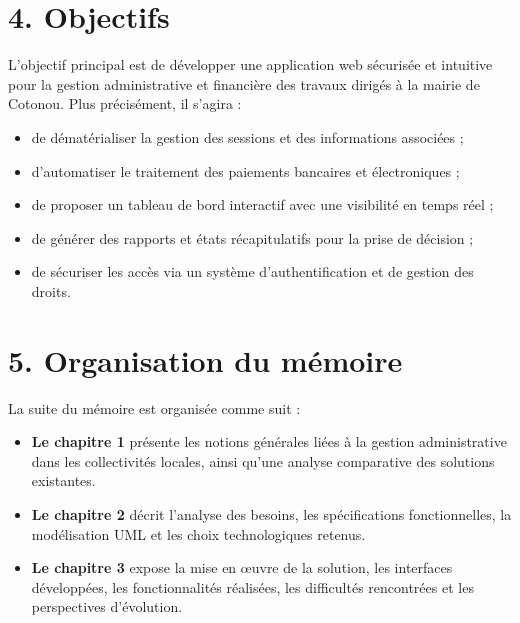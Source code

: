 \section*{4. Objectifs}
L'objectif principal est de développer une application web sécurisée et intuitive pour la gestion administrative et financière des travaux dirigés à la mairie de Cotonou. Plus précisément, il s'agira :
\begin{itemize}[label=\textbullet, leftmargin=1.5cm]
    \item de dématérialiser la gestion des sessions et des informations associées ;
    \item d'automatiser le traitement des paiements bancaires et électroniques ;
    \item de proposer un tableau de bord interactif avec une visibilité en temps réel ;
    \item de générer des rapports et états récapitulatifs pour la prise de décision ;
    \item de sécuriser les accès via un système d'authentification et de gestion des droits.
\end{itemize}

\section*{5. Organisation du mémoire}
La suite du mémoire est organisée comme suit :
\begin{itemize}[label=\textbullet, leftmargin=1.5cm]
    \item \textbf{Le chapitre 1} présente les notions générales liées à la gestion administrative dans les collectivités locales, ainsi qu'une analyse comparative des solutions existantes.
    \item \textbf{Le chapitre 2} décrit l'analyse des besoins, les spécifications fonctionnelles, la modélisation UML et les choix technologiques retenus.
    \item \textbf{Le chapitre 3} expose la mise en œuvre de la solution, les interfaces développées, les fonctionnalités réalisées, les difficultés rencontrées et les perspectives d'évolution.
\end{itemize}